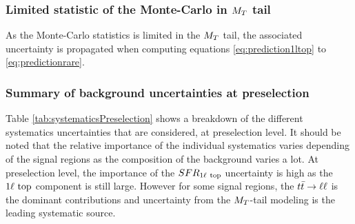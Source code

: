             \subsubsection{Limited statistic of the Monte-Carlo in $M_T$ tail}
            
            As the Monte-Carlo statistics is limited in the $M_T$ tail, the associated uncertainty
            is propagated when computing equations \ref{eq:prediction1ltop} to \ref{eq:predictionrare}.

            \subsubsection{Summary of background uncertainties at preselection}
           
            Table \ref{tab:systematicsPreselection} shows a breakdown of the different systematics
            uncertainties that are considered, at preselection level. It should be noted that the
            relative importance of the individual systematics varies depending of the signal regions
            as the composition of the background varies a lot. At preselection level, the importance
            of the $SFR_{1\ell~\text{top}}$ uncertainty is high as the $1\ell~\text{top}$ component is still large.
            However for some signal regions, the $t\bar{t} \rightarrow \ell \ell$ is the dominant contributions and
            uncertainty from the $M_T$-tail modeling is the leading systematic source.

